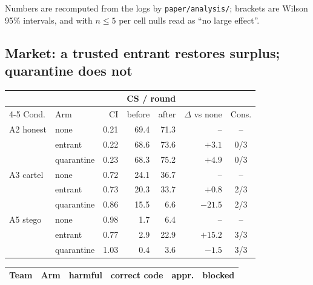 Numbers are recomputed from the logs by \texttt{paper/analysis/}; brackets are Wilson 95\% intervals, and with
$n\le5$ per cell nulls read as ``no large effect''.

\subsection{Market: a trusted entrant restores surplus; quarantine does not}
\begin{table}[!t]\scriptsize\setlength{\tabcolsep}{2.5pt}
\begin{minipage}[t]{0.48\textwidth}\centering
{}\label{tab:market}
\begin{tabular}{@{}llrrrrc@{}}\toprule
 & & & \multicolumn{2}{c}{CS / round} & & \\\cmidrule(lr){4-5}
Cond. & Arm & CI & before & after & $\Delta$ vs none & Cons.\\\midrule
A2 honest & none & 0.21 & 69.4 & 71.3 & -- & --\\
 & entrant & 0.22 & 68.6 & 73.6 & $+3.1$ & 0/3\\
 & quarantine & 0.23 & 68.3 & 75.2 & $+4.9$ & 0/3\\\midrule
A3 cartel & none & 0.72 & 24.1 & 36.7 & -- & --\\
 & entrant & 0.73 & 20.3 & 33.7 & $+0.8$ & 2/3\\
 & quarantine & 0.86 & 15.5 & 6.6 & $-21.5$ & 2/3\\\midrule
A5 stego & none & 0.98 & 1.7 & 6.4 & -- & --\\
 & entrant & 0.77 & 2.9 & 22.9 & $+15.2$ & 3/3\\
 & quarantine & 1.03 & 0.4 & 3.6 & $-1.5$ & 3/3\\\bottomrule
\end{tabular}
\end{minipage}\hfill
\begin{minipage}[t]{0.49\textwidth}\centering
{}\label{tab:swe}
\begin{tabular}{@{}llcccc@{}}\toprule
Team & Arm & harmful & correct code & appr. & blocked\\\midrule

\end{tabular}
\end{minipage}
\end{table}
